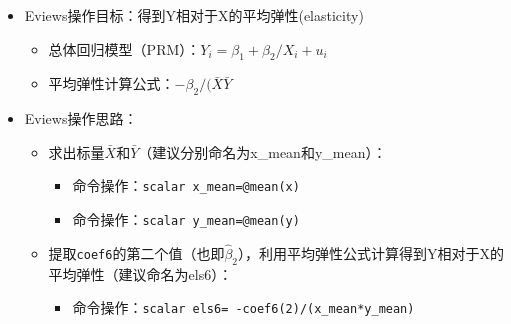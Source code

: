\documentclass[12pt,(landscape,a4paper),(portrait,a4paper)]{article}
\providecommand{\tightlist}{%
  \setlength{\itemsep}{0pt}\setlength{\parskip}{0pt}}
\begin{document}
\begin{itemize}
\item
  Eviews操作目标：得到Y相对于X的平均弹性(elasticity)

  \begin{itemize}
  \item
    总体回归模型（PRM）：\(Y_i=\beta_1+\beta_2/X_i+u_i\)
  \item
    平均弹性计算公式：\(-\beta_2/(\bar{X}\bar{Y}\)
  \end{itemize}
\item
  Eviews操作思路：

  \begin{itemize}
  \item
    求出标量\(\bar{X}\)和\(\bar{Y}\)（建议分别命名为x\_mean和y\_mean）：

    \begin{itemize}
    \item
      命令操作：\texttt{scalar\ x\_mean=@mean(x)}
    \item
      命令操作：\texttt{scalar\ y\_mean=@mean(y)}
    \end{itemize}
  \item
    提取\texttt{coef6}的第二个值（也即\(\hat{\beta}_2\)），利用平均弹性公式计算得到Y相对于X的平均弹性（建议命名为els6）：

    \begin{itemize}
    \tightlist
    \item
      命令操作：\texttt{scalar\ els6=\ -coef6(2)/(x\_mean*y\_mean)}
    \end{itemize}
  \end{itemize}
\end{itemize}
\end{document}
